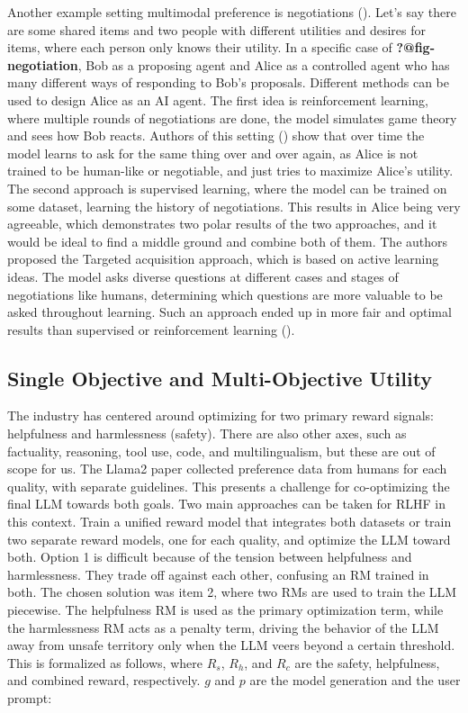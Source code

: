 \documentclass[
  letterpaper,
  numbers=noenddot,
  DIV=11]{scrreprt}
\theoremstyle{definition}
\theoremstyle{plain}
\theoremstyle{plain}
\theoremstyle{remark}
\begin{document}
Another example setting multimodal preference is negotiations
(). Let's say there are
some shared items and two people with different utilities and desires
for items, where each person only knows their utility. In a specific
case of \textbf{?@fig-negotiation}, Bob as a proposing agent and Alice
as a controlled agent who has many different ways of responding to Bob's
proposals. Different methods can be used to design Alice as an AI agent.
The first idea is reinforcement learning, where multiple rounds of
negotiations are done, the model simulates game theory and sees how Bob
reacts. Authors of this setting () show that over time the model learns to ask for the same
thing over and over again, as Alice is not trained to be human-like or
negotiable, and just tries to maximize Alice's utility. The second
approach is supervised learning, where the model can be trained on some
dataset, learning the history of negotiations. This results in Alice
being very agreeable, which demonstrates two polar results of the two
approaches, and it would be ideal to find a middle ground and combine
both of them. The authors proposed the Targeted acquisition approach,
which is based on active learning ideas. The model asks diverse
questions at different cases and stages of negotiations like humans,
determining which questions are more valuable to be asked throughout
learning. Such an approach ended up in more fair and optimal results
than supervised or reinforcement learning
().

\subsection{Single Objective and Multi-Objective
Utility}\label{single-objective-and-multi-objective-utility}

The industry has centered around optimizing for two primary reward
signals: helpfulness and harmlessness (safety). There are also other
axes, such as factuality, reasoning, tool use, code, and
multilingualism, but these are out of scope for us. The Llama2 paper
collected preference data from humans for each quality, with separate
guidelines. This presents a challenge for co-optimizing the final LLM
towards both goals. Two main approaches can be taken for RLHF in this
context. Train a unified reward model that integrates both datasets or
train two separate reward models, one for each quality, and optimize the
LLM toward both. Option 1 is difficult because of the tension between
helpfulness and harmlessness. They trade off against each other,
confusing an RM trained in both. The chosen solution was item 2, where
two RMs are used to train the LLM piecewise. The helpfulness RM is used
as the primary optimization term, while the harmlessness RM acts as a
penalty term, driving the behavior of the LLM away from unsafe territory
only when the LLM veers beyond a certain threshold. This is formalized
as follows, where \(R_s\), \(R_h\), and \(R_c\) are the safety,
helpfulness, and combined reward, respectively. \(g\) and \(p\) are the
model generation and the user prompt:
\end{document}
